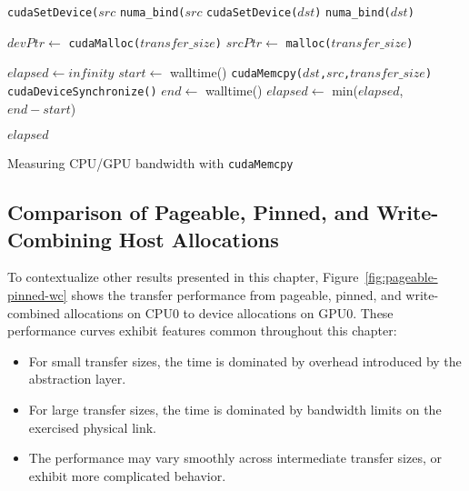 \begin{algorithm}
	
	\begin{algorithmic}[1]
		\Statex
		\State \texttt{cudaSetDevice($src$}
		\Else {}
		\State \texttt{numa\_bind($src$}
		\EndIf
		\State \texttt{cudaSetDevice($dst$)}
		\Else {}
		\State \texttt{numa\_bind($dst$)}
		\EndIf
		
		\State $devPtr \gets$ \texttt{cudaMalloc($transfer\_size$)} 
		\State $srcPtr \gets$ \texttt{malloc($transfer\_size$)} 
		
		\State $elapsed \gets infinity$ 
		\State $start \gets$ walltime()
		\State \texttt{cudaMemcpy($dst$,$src$,$transfer\_size$)}
		\State \texttt{cudaDeviceSynchronize()}
		\State $end \gets$ walltime()
		\State $elapsed \gets$ min($elapsed$, $end-start$)
		\EndFor
		
		\Return $elapsed$
		\EndFunction
		
	\end{algorithmic}
	\caption[Measuring CPU/GPU bandwidth with \texttt{cudaMemcpy}]{
		Measuring CPU/GPU bandwidth with \texttt{cudaMemcpy}
	}
	\label{alg:explicit}
\end{algorithm}

\subsection{Comparison of Pageable, Pinned, and Write-Combining Host Allocations}
\label{sec:explicit-pageable-pinned-wc}

To contextualize other results presented in this chapter, Figure~\ref{fig:pageable-pinned-wc} shows the transfer performance from pageable, pinned, and write-combined allocations on CPU0 to device allocations on GPU0.
These performance curves exhibit features common throughout this chapter:
\begin{itemize}
	\item For small transfer sizes, the time is dominated by overhead introduced by the abstraction layer.
	\item For large transfer sizes, the time is dominated by bandwidth limits on the exercised physical link.
	\item The performance may vary smoothly across intermediate transfer sizes, or exhibit more complicated behavior.
\end{itemize}

